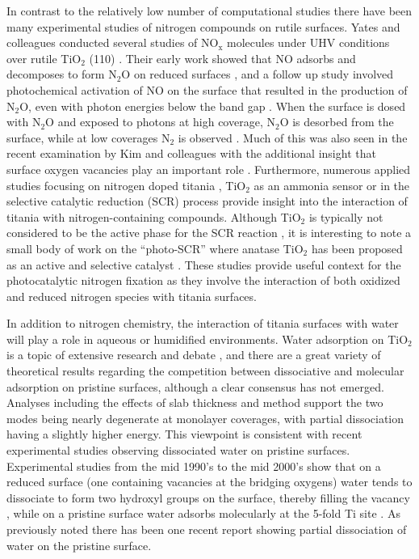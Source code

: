 \documentclass[journal=ascecg,manuscript=article,articletitle=true]{achemso}
\begin{document}
In contrast to the relatively low number of computational studies there have been many experimental studies of nitrogen compounds on rutile surfaces. Yates and colleagues conducted several studies of NO$_{\mathrm{x}}$ molecules under UHV conditions over rutile TiO$_2$ (110) \cite{Lu1994,Rusu2000,Rusu2001}. Their early work showed that NO adsorbs and decomposes to form N$_2$O on reduced surfaces \cite{Lu1994}, and a follow up study involved photochemical activation of NO on the surface that resulted in the production of N$_2$O, even with photon energies below the band gap \cite{Rusu2000}. When the surface is dosed with N$_2$O and exposed to photons at high coverage, N$_2$O is desorbed from the surface, while at low coverages N$_2$ is observed \cite{Rusu2001}. Much of this was also seen in the recent examination by Kim and colleagues with the additional insight that surface oxygen vacancies play an important role \cite{Kim2016,Kim2014}. Furthermore, numerous applied studies focusing on nitrogen doped titania \cite{Chen_2007}, TiO$_2$ as an ammonia sensor \cite{Karunagaran_2007,Suganuma_2015} or in the selective catalytic reduction (SCR) process \cite{Busca_1998,Ramis_1990,Giraud_2014,Liu_2017} provide insight into the interaction of titania with nitrogen-containing compounds. Although TiO$_2$ is typically not considered to be the active phase for the SCR reaction \cite{Topsoe_1994}, it is interesting to note a small body of work on the ``photo-SCR'' where anatase TiO$_2$ has been proposed as an active and selective catalyst \cite{Teramura_2002,Teramura_2003,Teramura_2004,Yamazoe_2006,Yamazoe_2007,Yamamoto_2013,Lasek_2013,Ji_2014}. These studies provide useful context for the photocatalytic nitrogen fixation as they involve the interaction of both oxidized and reduced nitrogen species with titania surfaces.


In addition to nitrogen chemistry, the interaction of titania surfaces with water will play a role in aqueous or humidified environments. Water adsorption on TiO$_2$ is a topic of extensive research and debate \cite{Sun2010,Harris2004,Kumar2013,Pang2008,Pang_2013,Benkoula2015,Lindan_1996,Bates1998,Schaub_2001,Lindan_2005}, and there are a great variety of theoretical results regarding the competition between dissociative\cite{Lindan_1996,Lindan_2005} and molecular adsorption\cite{Bates1998,Schaub_2001,Kowalski_2009} on pristine surfaces, although a clear consensus has not emerged. Analyses including the effects of slab thickness\cite{Harris2004} and method\cite{Kumar2013} support the two modes being nearly degenerate at monolayer coverages, with partial dissociation having a slightly higher energy. This viewpoint is consistent with recent experimental studies observing dissociated water on pristine surfaces.\cite{Walle2009}  
Experimental studies from the mid 1990's to the mid 2000's show that on a reduced surface (one containing vacancies at the bridging oxygens) water tends to dissociate to form two hydroxyl groups on the surface, thereby filling the vacancy \cite{Henderson1996,Schaub_2001,Krischok_2001,Ketteler_2007}, while on a pristine surface water adsorbs molecularly at the 5-fold Ti site \cite{Hugenschmidt_1994}. As previously noted there has been one recent report showing partial dissociation of water on the pristine surface.\cite{Walle2009}
\end{document}
